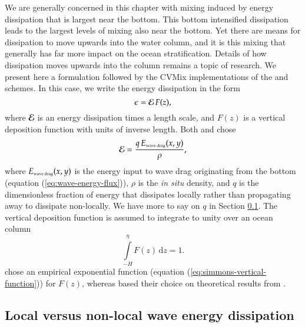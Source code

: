 We are generally concerned in this chapter with mixing induced by
energy dissipation that is largest near the bottom.  This bottom
intensified dissipation leads to the largest levels of mixing also
near the bottom.  Yet there are means for dissipation to move upwards
into the water column, and it is this mixing that generally has far
more impact on the ocean stratification.  Details of how dissipation
moves upwards into the column remains a topic of research.  We present
here a formulation followed by the CVMix implementations of the
\cite{Simmonsetal2004} and \cite{Melet_etal_2013} schemes.  In this
case, we write the energy dissipation in the form
\begin{equation}
 \epsilon = {\cal E} \, F(z),
\label{eq:wave-drag-dissipation-form}
\end{equation}
where ${\cal E}$ is an energy dissipation times a length scale, and
$F(z)$ is a vertical deposition function with units of inverse length.
Both \cite{Simmonsetal2004} and \cite{Melet_etal_2013} chose
\begin{equation}
  {\cal E} =  \frac{ q \, E_{\mbox{\tiny wave drag}}(x,y)  }{\rho},
\label{eq:wave-dissipation-time-length}
\end{equation}
where $E_{\mbox{\tiny wave drag}}(x,y)$ is the energy input to wave
drag originating from the bottom (equation
(\ref{eq:wave-energy-flux})), $\rho$ is the {\it in situ} density, and
$q$ is the dimensionless fraction of energy that dissipates locally
rather than propagating away to dissipate non-locally. We have more to
say on $q$ in Section
\ref{subsection:local-or-non-local-energy-waves}.  The vertical
deposition function is assumed to integrate to unity over an ocean
column
\begin{equation}
  \int\limits_{-H}^{\eta} F(z) \, \mathrm{d}z = 1.  
\label{eq:normalization-of-Fz}
\end{equation}
\cite{Simmonsetal2004} chose an empirical exponential function
(equation (\ref{eq:simmons-vertical-function})) for $F(z)$, whereas
\cite{Melet_etal_2013} based their choice on theoretical results from
\cite{Polzin2009}.  


\subsection{Local versus non-local wave energy dissipation}
\label{subsection:local-or-non-local-energy-waves}

